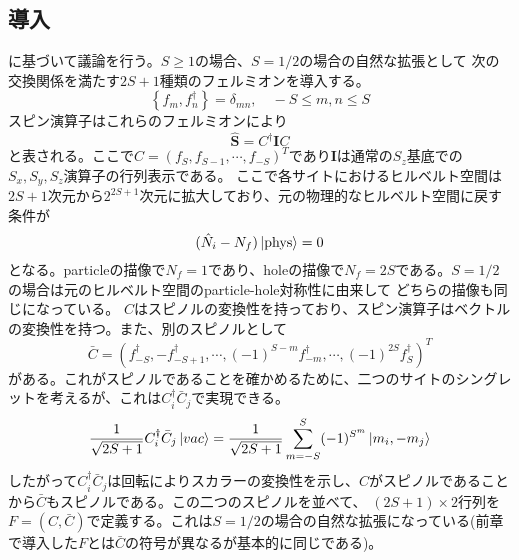 \documentclass[11pt, aps, longbibliography]{article}
\begin{document}
    \subsection{導入}
        \cite{PhysRevB.82.144422}に基づいて議論を行う。$S\geq1$の場合、$S=1/2$の場合の自然な拡張として
        次の交換関係を満たす$2S+1$種類のフェルミオンを導入する。
        \begin{equation}\label{eq:highS-MF-1}
            \left\{f_m,f_n^\dagger \right\} = \delta_{mn}, \quad -S\leq m,n \leq S
        \end{equation}
        スピン演算子はこれらのフェルミオンにより
        \begin{equation}\label{eq:highS-MF-2}
            \hat{\boldsymbol{S}} = C^\dagger \boldsymbol{I}C
        \end{equation}
        と表される。ここで$C=(f_S, f_{S-1}, \cdots, f_{-S})^T$であり$\boldsymbol{I}$は通常の$S_z$基底での$S_x,S_y,S_z$演算子の行列表示である。
        ここで各サイトにおけるヒルベルト空間は$2S+1$次元から$2^{2S+1}$次元に拡大しており、元の物理的なヒルベルト空間に戻す条件が
        \begin{equation}\label{eq:highS-MF-3}
            (\hat{N}_i - N_f) \ket{\text{phys}} = 0
        \end{equation}
        となる。particleの描像で$N_f=1$であり、holeの描像で$N_f=2S$である。$S=1/2$の場合は元のヒルベルト空間のparticle-hole対称性に由来して
        どちらの描像も同じになっている。
        $C$はスピノルの変換性を持っており、スピン演算子はベクトルの変換性を持つ。また、別のスピノルとして
        \begin{equation}\label{eq:highS-MF-4}
            \bar{C} = (f_{-S}^\dagger, -f_{-S+1}^\dagger, \cdots, (-1)^{S-m}f_{-m}^\dagger, \cdots, (-1)^{2S}f_{S}^\dagger)^T
        \end{equation}
        がある。これがスピノルであることを確かめるために、二つのサイトのシングレットを考えるが、これは$C_i^\dagger \bar{C}_j$で実現できる。
        \begin{equation}\label{eq:highS-MF-5}
            \frac{1}{\sqrt{2S+1}}C_i^\dagger \bar{C}_j \ket{vac} = \frac{1}{\sqrt{2S+1}}\sum_{m=-S}^{S}(-1)^{S^m}\ket{m_i,-m_j}
        \end{equation}
        したがって$C_i^\dagger \bar{C}_j$は回転によりスカラーの変換性を示し、$C$がスピノルであることから$\bar{C}$もスピノルである。この二つのスピノルを並べて、
        $(2S+1)\times 2$行列を$F=(C,\bar{C})$で定義する。これは$S=1/2$の場合の自然な拡張になっている(前章で導入した$F$とは$\bar{C}$の符号が異なるが基本的に同じである)。
\end{document}
